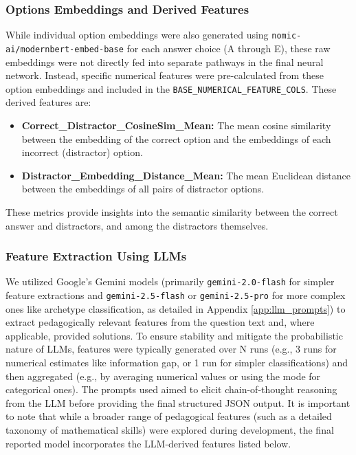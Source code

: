 \documentclass[
    a4paper, %
    10pt, %
    twoside, %
]{LTJournalArticle}
\begin{document}
\subsubsection{Options Embeddings and Derived Features}
While individual option embeddings were also generated using \texttt{nomic-ai/modernbert-embed-base} for each answer choice (A through E), these raw embeddings were not directly fed into separate pathways in the final neural network. Instead, specific numerical features were pre-calculated from these option embeddings and included in the \texttt{BASE\_NUMERICAL\_FEATURE\_COLS}. These derived features are:
\begin{itemize}
    \item \textbf{Correct\_Distractor\_CosineSim\_Mean:} The mean cosine similarity between the embedding of the correct option and the embeddings of each incorrect (distractor) option.
    \item \textbf{Distractor\_Embedding\_Distance\_Mean:} The mean Euclidean distance between the embeddings of all pairs of distractor options.
\end{itemize}
These metrics provide insights into the semantic similarity between the correct answer and distractors, and among the distractors themselves.

\subsubsection{Feature Extraction Using LLMs}
We utilized Google's Gemini models (primarily \texttt{gemini-2.0-flash} for simpler feature extractions and \texttt{gemini-2.5-flash} or \texttt{gemini-2.5-pro} for more complex ones like archetype classification, as detailed in Appendix \ref{app:llm_prompts}) to extract pedagogically relevant features from the question text and, where applicable, provided solutions. To ensure stability and mitigate the probabilistic nature of LLMs, features were typically generated over N runs (e.g., 3 runs for numerical estimates like information gap, or 1 run for simpler classifications) and then aggregated (e.g., by averaging numerical values or using the mode for categorical ones). The prompts used aimed to elicit chain-of-thought reasoning from the LLM before providing the final structured JSON output. It is important to note that while a broader range of pedagogical features (such as a detailed taxonomy of mathematical skills) were explored during development, the final reported model incorporates the LLM-derived features listed below.
\end{document}
